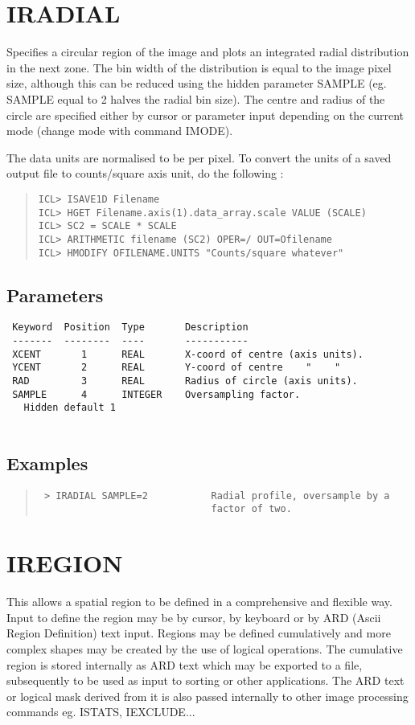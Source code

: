 \documentclass{book}
\renewcommand{\_}{{\tt\char'137}}     %
\begin{document}
\section{IRADIAL}
Specifies a circular region of the image and plots an integrated
radial distribution in the next zone. The bin width of the
distribution is equal to the image pixel size, although this can
be reduced using the hidden parameter SAMPLE (eg. SAMPLE equal to
2 halves the radial bin size). The centre and radius of the circle
are specified either by cursor or parameter input depending on the
current mode (change mode with command IMODE).
 
The data units are normalised to be per pixel. To convert the
units of a saved output file to counts/square axis unit, do
the following :
 
\begin{quote}\begin{verbatim}
ICL> ISAVE1D Filename
ICL> HGET Filename.axis(1).data_array.scale VALUE (SCALE)
ICL> SC2 = SCALE * SCALE
ICL> ARITHMETIC filename (SC2) OPER=/ OUT=Ofilename
ICL> HMODIFY OFILENAME.UNITS "Counts/square whatever"
\end{verbatim}\end{quote}
\subsection{Parameters}
\begin{verbatim}
 Keyword  Position  Type       Description
 -------  --------  ----       -----------
 XCENT       1      REAL       X-coord of centre (axis units).
 YCENT       2      REAL       Y-coord of centre    "    "
 RAD         3      REAL       Radius of circle (axis units).
 SAMPLE      4      INTEGER    Oversampling factor.
   Hidden default 1
 
\end{verbatim}\subsection{Examples}
\begin{quote}\begin{verbatim}
 > IRADIAL SAMPLE=2           Radial profile, oversample by a
                              factor of two.
\end{verbatim}\end{quote}
\section{IREGION}
This allows a spatial region to be defined in a comprehensive and
flexible way. Input to define the region may be by cursor, by
keyboard or by ARD (Ascii Region Definition) text input. Regions
may be defined cumulatively and more complex shapes may be created
by the use of logical operations. The cumulative region is stored
internally as ARD text which may be exported to a file, subsequently
to be used as input to sorting or other applications. The ARD text
or logical mask derived from it is also passed internally to other
image processing commands eg. ISTATS, IEXCLUDE...
 
\end{document}
